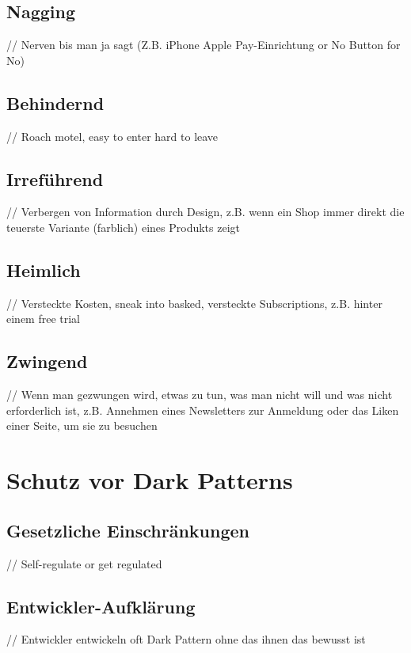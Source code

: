 \documentclass[conference,compsoc,final,a4paper]{IEEEtran}
\begin{document}
\subsection{Nagging}
// Nerven bis man ja sagt (Z.B. iPhone Apple Pay-Einrichtung or No Button for No)
\subsection{Behindernd}
// Roach motel, easy to enter hard to leave
\subsection{Irreführend}
// Verbergen von Information durch Design, z.B. wenn ein Shop immer direkt die teuerste Variante (farblich) eines Produkts zeigt
\subsection{Heimlich}
// Versteckte Kosten, sneak into basked, versteckte Subscriptions, z.B. hinter einem free trial
\subsection{Zwingend}
// Wenn man gezwungen wird, etwas zu tun, was man nicht will und was nicht erforderlich ist, z.B. Annehmen eines Newsletters zur Anmeldung oder das Liken einer Seite, um sie zu besuchen


\section{Schutz vor Dark Patterns}
\subsection{Gesetzliche Einschränkungen}
// Self-regulate or get regulated
\subsection{Entwickler-Aufklärung}
// Entwickler entwickeln oft Dark Pattern ohne das ihnen das bewusst ist
\end{document}
